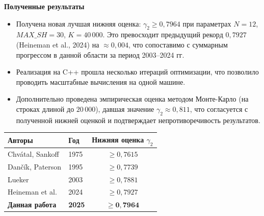 \documentclass[12pt,a4paper]{article}
\begin{document}
\bigskip

\textbf{\large Полученные результаты}

\begin{itemize}[leftmargin=2em]
  \item Получена новая лучшая нижняя оценка: $\gamma_2 \geq 0{,}7964$ при параметрах $N = 12$, $\mathit{MAX\_SH} = 30$, $K = 40\,000$. Это превосходит предыдущий рекорд $0{,}7927$ (Heineman et al., 2024) на $\approx 0{,}004$, что сопоставимо с суммарным прогрессом в данной области за период 2003--2024 гг.
  \item Реализация на C++ прошла несколько итераций оптимизации, что позволило проводить масштабные вычисления на одной машине.
  \item Дополнительно проведена эмпирическая оценка методом Монте-Карло (на строках длиной до $20\,000$), давшая значение $\gamma_2 \approx 0{,}811$, что согласуется с полученной нижней оценкой и подтверждает непротиворечивость результатов.
\end{itemize}

\medskip

\begin{table}[h]
\centering
\begin{tabular}{llc}
  \toprule
  \textbf{Авторы} & \textbf{Год} & \textbf{Нижняя оценка $\gamma_2$} \\
  \midrule
  Chv\'{a}tal, Sankoff & 1975 & $\geq 0{,}7615$ \\
  Dan\v{c}\'{i}k, Paterson & 1995 & $\geq 0{,}7739$ \\
  Lueker & 2003 & $\geq 0{,}7881$ \\
  Heineman et al. & 2024 & $\geq 0{,}7927$ \\
  \textbf{Данная работа} & \textbf{2025} & $\geq \mathbf{0{,}7964}$ \\
  \bottomrule
\end{tabular}
\end{table}
\end{document}
